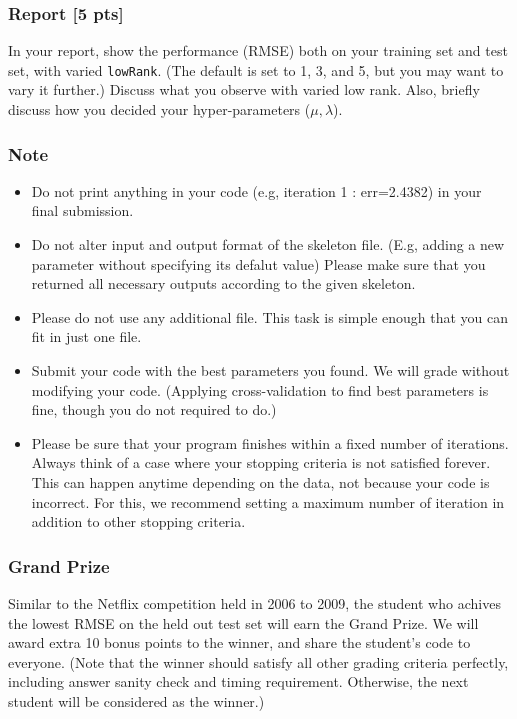 \documentclass[twoside,10pt]{article}
\begin{document}
\subsubsection*{Report [5 pts]}
In your report, show the performance (RMSE) both on your training
set and test set, with varied \texttt{lowRank}. (The default is set
to 1, 3, and 5, but you may want to vary it further.) Discuss what
you observe with varied low rank. Also, briefly discuss how you
decided your hyper-parameters ($\mu, \lambda$).

\subsubsection*{Note}
\begin{itemize}
  \item Do not print anything in your code (e.g, iteration 1 :
  err=2.4382) in your final submission.
  \item Do not alter input and output format of the skeleton file. (E.g, adding a new parameter without specifying its defalut value) Please make sure that you returned all necessary outputs according to the given skeleton.
  \item Please do not use any additional file. This task is simple enough that you can fit in just one file.
  \item Submit your code with the best parameters you found. We will grade without
modifying your code. (Applying cross-validation to find best
parameters is fine, though you do not required to do.)
  \item Please be sure that your program finishes within a fixed number of
iterations. Always think of a case where your stopping criteria is
not satisfied forever. This can happen anytime depending on the
data, not because your code is incorrect. For this, we recommend
setting a maximum number of iteration in addition to other stopping
criteria.
\end{itemize}

\subsubsection*{Grand Prize}

Similar to the Netflix competition held in 2006 to 2009, the student who achives the lowest RMSE on the held out test set will earn the Grand Prize. We will award extra 10 bonus points to the winner, and share the student's code to everyone. (Note that the winner should satisfy all other grading criteria perfectly, including answer sanity check and timing requirement. Otherwise, the next student will be considered as the winner.)

%
%
\end{document}
